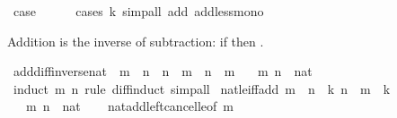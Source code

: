 \begin{isabellebody}
\ {\isacharquery}{\kern0pt}case\isanewline
\ \ \ \ \isamarkupfalse%
\ {\isacharparenleft}{\kern0pt}cases\ k{\isacharparenright}{\kern0pt}\ {\isacharparenleft}{\kern0pt}simp{\isacharunderscore}{\kern0pt}all\ add{\isacharcolon}{\kern0pt}\ add{\isacharunderscore}{\kern0pt}less{\isacharunderscore}{\kern0pt}mono{\isacharparenright}{\kern0pt}\isanewline
{}\isamarkupfalse%
%
\endisatagproof
{\isafoldproof}%
%
\isadelimproof
%
\endisadelimproof
%
\begin{isamarkuptext}%
Addition is the inverse of subtraction:
  if  then .%
\end{isamarkuptext}\isamarkuptrue%
\isamarkupfalse%
\ add{\isacharunderscore}{\kern0pt}diff{\isacharunderscore}{\kern0pt}inverse{\isacharunderscore}{\kern0pt}nat{\isacharcolon}{\kern0pt}\ {\isachardoublequoteopen}{\isasymnot}\ m\ {\isacharless}{\kern0pt}\ n\ {\isasymLongrightarrow}\ n\ {\isacharplus}{\kern0pt}\ {\isacharparenleft}{\kern0pt}m\ {\isacharminus}{\kern0pt}\ n{\isacharparenright}{\kern0pt}\ {\isacharequal}{\kern0pt}\ m{\isachardoublequoteclose}\isanewline
\ \ \ m\ n\ {\isacharcolon}{\kern0pt}{\isacharcolon}{\kern0pt}\ nat\isanewline
%
\isadelimproof
\ \ %
\endisadelimproof
%
\isatagproof
{}\isamarkupfalse%
\ {\isacharparenleft}{\kern0pt}induct\ m\ n\ rule{\isacharcolon}{\kern0pt}\ diff{\isacharunderscore}{\kern0pt}induct{\isacharparenright}{\kern0pt}\ simp{\isacharunderscore}{\kern0pt}all%
\endisatagproof
{\isafoldproof}%
%
\isadelimproof
\isanewline
%
\endisadelimproof
\isanewline
{}\isamarkupfalse%
\ nat{\isacharunderscore}{\kern0pt}le{\isacharunderscore}{\kern0pt}iff{\isacharunderscore}{\kern0pt}add{\isacharcolon}{\kern0pt}\ {\isachardoublequoteopen}m\ {\isasymle}\ n\ {\isasymlongleftrightarrow}\ {\isacharparenleft}{\kern0pt}{\isasymexists}k{\isachardot}{\kern0pt}\ n\ {\isacharequal}{\kern0pt}\ m\ {\isacharplus}{\kern0pt}\ k{\isacharparenright}{\kern0pt}{\isachardoublequoteclose}\isanewline
\ \ \ m\ n\ {\isacharcolon}{\kern0pt}{\isacharcolon}{\kern0pt}\ nat\isanewline
%
\isadelimproof
\ \ %
\endisadelimproof
%
\isatagproof
{}\isamarkupfalse%
\ nat{\isacharunderscore}{\kern0pt}add{\isacharunderscore}{\kern0pt}left{\isacharunderscore}{\kern0pt}cancel{\isacharunderscore}{\kern0pt}le{\isacharbrackleft}{\kern0pt}of\ m\ {}{\isacharbrackright}{\kern0pt}\ \isamarkupfalse%

\end{isabellebody}
